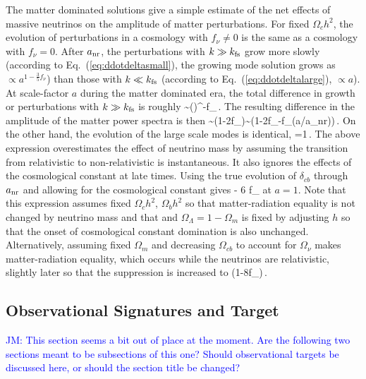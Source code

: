 The matter dominated solutions give a simple estimate of the net effects of massive neutrinos on the amplitude of matter perturbations. For fixed $\Omega_c h^2$, the evolution of perturbations in a cosmology with $f_\nu \neq 0$ is the same as a cosmology with $f_\nu =0$. After $a_{\rm nr}$, the perturbations with $k\gg k_{\rm fs}$ grow more slowly (according to Eq.~(\ref{eq:ddotdeltasmall}), the growing mode solution grows as  $\propto a^{1-\frac{3}{5}f_\nu}$) than those with $k\ll k_{\rm fs}$ (according to Eq.~(\ref{eq:ddotdeltalarge}), $\propto a$).  At scale-factor $a$ during the matter dominated era, the total difference in growth or perturbations with $k\gg k_{\rm fs}$ is roughly
\beq
{} \sim \left(\right)^{-f_\nu}\,.
\eeq
The resulting difference in the amplitude of the matter power spectra is then 
\beq
{}\sim (1-2f_\nu)\sim \left(1-2f_\nu -f_\nu\ln\left(a/a_{\rm nr}\right)\right)\,.
\eeq
On the other hand, the evolution of the large scale modes is identical,
\beq
{}=1\,.
\eeq
The above expression overestimates the effect of neutrino mass by assuming the transition from relativistic to non-relativistic is instantaneous. It also ignores the effects of the cosmological constant at late times. Using the true evolution of $\delta_{cb}$ through $a_{\rm nr}$ and allowing for the cosmological constant gives 
\beq
{} - 6 f_\nu
\eeq
at $a=1$. Note that this expression assumes fixed $\Omega_ch^2$, $\Omega_bh^2$ so that matter-radiation equality is not changed by neutrino mass and that and $\Omega_\Lambda = 1-\Omega_m$ is fixed by adjusting $h$ so that the onset of cosmological constant domination is also unchanged. Alternatively, assuming fixed $\Omega_m$ and decreasing $\Omega_{cb}$ to account for $\Omega_\nu$ makes matter-radiation equality, which occurs while the neutrinos are relativistic, slightly later so that the suppression is increased to
\beq
{} \approx (1-8f_\nu)\,.
\eeq

\subsection{Observational Signatures and Target}
%
\textcolor{blue}{JM: This section seems a bit out of place at the moment. Are the following two sections meant to be subsections of this one?  Should observational targets be discussed here, or should the section title be changed?}

